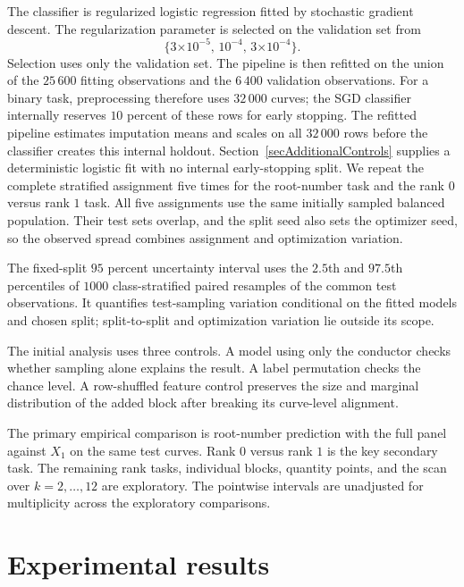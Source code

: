 \documentclass[12pt,reqno]{amsart}
\numberwithin{equation}{section}
\theoremstyle{plain}
\theoremstyle{definition}
\theoremstyle{remark}
\begin{document}
The classifier is regularized logistic regression fitted by stochastic gradient descent.
The regularization parameter is selected on the validation set from
\begin{equation*}
\{3\mathord{\times}10^{-5},\,10^{-4},\,3\mathord{\times}10^{-4}\}.
\end{equation*}
Selection uses only the validation set.  The pipeline is then refitted on the union of the $25\,600$ fitting observations and the $6\,400$ validation observations.
For a binary task, preprocessing therefore uses $32\,000$ curves; the SGD classifier internally reserves $10$ percent of these rows for early stopping.
The refitted pipeline estimates imputation means and scales on all $32\,000$ rows before the classifier creates this internal holdout.
Section~\ref{secAdditionalControls} supplies a deterministic logistic fit with no internal early-stopping split.
We repeat the complete stratified assignment five times for the root-number task and the rank $0$ versus rank $1$ task.
All five assignments use the same initially sampled balanced population.
Their test sets overlap, and the split seed also sets the optimizer seed, so the observed spread combines assignment and optimization variation.

The fixed-split $95$ percent uncertainty interval uses the $2.5$th and $97.5$th percentiles of $1000$ class-stratified paired resamples of the common test observations.
It quantifies test-sampling variation conditional on the fitted models and chosen split; split-to-split and optimization variation lie outside its scope.

The initial analysis uses three controls.
A model using only the conductor checks whether sampling alone explains the result.
A label permutation checks the chance level.
A row-shuffled feature control preserves the size and marginal distribution of the added block after breaking its curve-level alignment.

The primary empirical comparison is root-number prediction with the full panel against $X_1$ on the same test curves.
Rank $0$ versus rank $1$ is the key secondary task.  The remaining rank tasks, individual blocks, quantity points, and the scan over $k=2,\ldots,12$ are exploratory.
The pointwise intervals are unadjusted for multiplicity across the exploratory comparisons.

\section{Experimental results}
\label{secResults}
\end{document}
